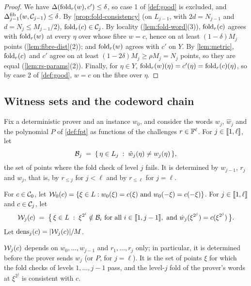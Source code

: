 \begin{proof}
We have $\Delta(\mathrm{fold}_r(w), c') \le \delta$, so case 1 of \cref{def:good} is excluded, and $\Delta^{\mathrm{fib}}_{j-1}(w, \mathcal{C}_{j-1}) \le \delta$.
By \cref{prop:fold-consistency} (on $L_{j-1}$, with $2d = N_{j-1}$ and $d = N_j \le M_{j-1}/2$), $\mathrm{fold}_r(c) \in \mathcal{C}_j$.
By locality (\cref{lem:fold-word}(3)), $\mathrm{fold}_r(c)$ agrees with $\mathrm{fold}_r(w)$ at every $\eta$ over whose fibre $w = c$, hence on at least $(1-\delta)M_j$ points (\cref{lem:fibre-dist}(2)); and $\mathrm{fold}_r(w)$ agrees with $c'$ on $Y$.
By \cref{lem:metric}, $\mathrm{fold}_r(c)$ and $c'$ agree on at least $(1-2\delta)M_j \ge \rho M_j = N_j$ points, so they are equal (\cref{lem:rs-params}(2)).
Finally, for $\eta \in Y$, $\mathrm{fold}_r(w)(\eta) = c'(\eta) = \mathrm{fold}_r(c)(\eta)$, so by case 2 of \cref{def:good}, $w = c$ on the fibre over $\eta$.
\end{proof}

\subsection{Witness sets and the codeword chain}\label{sec:fold:witness}

Fix a deterministic prover and an instance $w_0$, and consider the words $w_j$, $\hat w_j$ and the polynomial $P$ of \cref{def:fpt} as functions of the challenges $r \in \mathbb{F}^\ell$.
For $j \in \llbracket 1, \ell \rrbracket$, let
\[
  \mathcal{B}_j \;=\; \{\, \eta \in L_j \;:\; \hat w_j(\eta) \ne w_j(\eta) \,\},
\]
the set of points where the fold check of level $j$ fails.
It is determined by $w_{j-1}$, $r_j$ and $w_j$, that is, by $r_{\le j}$ for $j < \ell$ and by $r_{\le \ell}$ for $j = \ell$.

\begin{definition}\label{def:witness}
For $c \in \mathcal{C}_0$, let $\mathcal{W}_0(c) = \{\xi \in L : w_0(\xi) = c(\xi) \text{ and } w_0(-\xi) = c(-\xi)\}$.
For $j \in \llbracket 1, \ell \rrbracket$ and $c \in \mathcal{C}_j$, let
\[
  \mathcal{W}_j(c) \;=\; \bigl\{\, \xi \in L \;:\; \xi^{2^i} \notin \mathcal{B}_i \text{ for all } i \in \llbracket 1, j-1 \rrbracket, \text{ and } \hat w_j(\xi^{2^j}) = c(\xi^{2^j}) \,\bigr\}.
\]
Let $\mathrm{dens}_j(c) = |\mathcal{W}_j(c)|/M$.
\end{definition}

$\mathcal{W}_j(c)$ depends on $w_0,\dots,w_{j-1}$ and $r_1,\dots,r_j$ only; in particular, it is determined before the prover sends $w_j$ (or $P$, for $j = \ell$).
It is the set of points $\xi$ for which the fold checks of levels $1,\dots,j-1$ pass, and the level-$j$ fold of the prover's words at $\xi^{2^j}$ is consistent with $c$.

